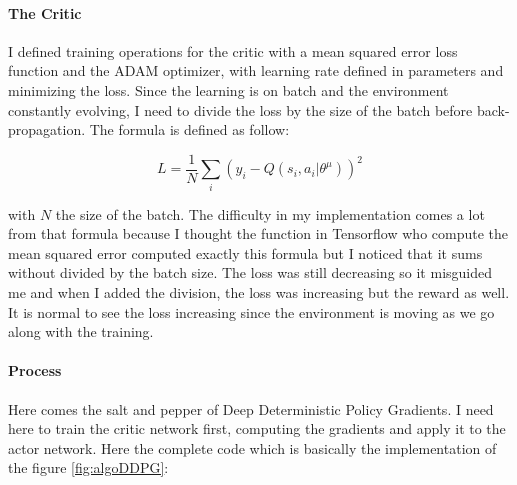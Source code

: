 \documentclass{article}
\begin{document}
\paragraph{The Critic}

I defined training operations for the critic with a mean squared error loss
function and the ADAM optimizer, with learning rate defined in parameters and
minimizing the loss. Since the learning is on batch and the environment
constantly evolving, I need to divide the loss by the size of the batch before
back-propagation. The formula is defined as follow:

\begin{equation}
L = \frac{1}{N}\sum_{i}(y_{i}-Q(s_{i},a_{i}|\theta^{\mu}))^{2}
\end{equation}

with $N$ the size of the batch. The difficulty in my implementation comes a lot
from that formula because I thought the function in Tensorflow who compute the
mean squared error computed exactly this formula but I noticed that it sums
without divided by the batch size. The loss was still decreasing so it misguided
me and when I added the division, the loss was increasing but the reward as
well. It is normal to see the loss increasing since the environment is moving as
we go along with the training.

\paragraph{Process}
Here comes the salt and pepper of Deep Deterministic Policy Gradients. I need
here to train the critic network first, computing the gradients and apply it to
the actor network. Here the complete code which is basically the implementation
of the figure \ref{fig:algoDDPG}:
\end{document}
